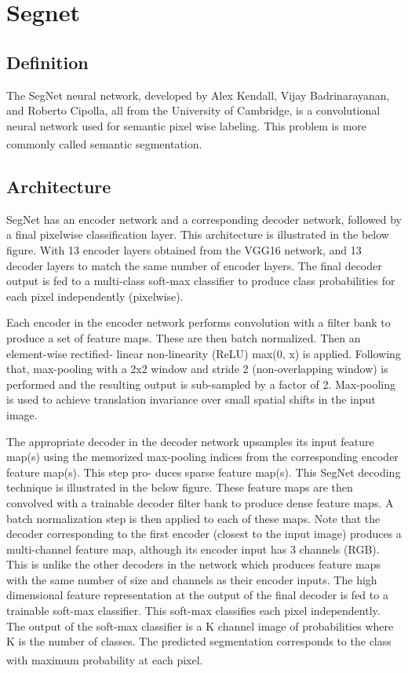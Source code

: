 \section{Segnet}
\subsection{Definition}
The SegNet neural network, developed by Alex Kendall, Vijay Badrinarayanan, and Roberto Cipolla, all from the University of Cambridge, is a convolutional neural network used for semantic pixel wise labeling. This problem is more commonly called semantic segmentation. \textsuperscript{\cite{badrinarayanan2017segnet}}

\subsection{Architecture}
SegNet has an encoder network and a corresponding decoder network, followed by a final pixelwise classification layer. This architecture is illustrated in the below figure.
With 13 encoder layers obtained from the VGG16 network, and 13 decoder layers to match the same number of encoder layers. The final decoder output is fed to a multi-class soft-max classifier to produce class probabilities for each pixel independently (pixelwise).

Each encoder in the encoder network performs convolution with a filter bank to produce a set of feature maps. These are then batch normalized. Then an element-wise rectified- linear non-linearity (ReLU) max(0, x) is applied. Following that, max-pooling with a 2x2 window and stride 2 (non-overlapping window) is performed and the resulting output is sub-sampled by a factor of 2. Max-pooling is used to achieve translation invariance over small spatial shifts in the input image.

The appropriate decoder in the decoder network upsamples its input feature map(s) using the memorized max-pooling indices from the corresponding encoder feature map(s). This step pro- duces sparse feature map(s). This SegNet decoding technique is illustrated in the below figure.
These feature maps are then convolved with a trainable decoder filter bank to produce dense feature maps. A batch normalization step is then applied to each of these maps. Note that the decoder corresponding to the first encoder (closest to the input image) produces a multi-channel feature map, although its encoder input has 3 channels (RGB).
This is unlike the other decoders in the network which produces feature maps with the same number of size and channels as their encoder inputs. The high dimensional feature representation at the output of the final decoder is fed to a trainable soft-max classifier.
This soft-max classifies each pixel independently. The output of the soft-max classifier is a K channel image of probabilities where K is the number of classes. The predicted segmentation corresponds to the class with maximum probability at each pixel. \textsuperscript{\cite{badrinarayanan2017segnet}}

